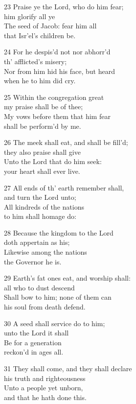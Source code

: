 23 Praise ye the Lord, who do him fear;\\
him glorify all ye\\
The seed of Jacob: fear him all\\
that Isr’el’s children be.

24 For he despis’d not nor abhorr’d\\
th’ afflicted’s misery;\\
Nor from him hid his face, but heard\\
when he to him did cry.

25 Within the congregation great\\
my praise shall be of thee;\\
My vows before them that him fear\\
shall be perform’d by me.

26 The meek shall eat, and shall be fill’d;\\
they also praise shall give\\
Unto the Lord that do him seek:\\
your heart shall ever live.

27 All ends of th’ earth remember shall,\\
and turn the Lord unto;\\
All kindreds of the nations\\
to him shall homage do:

28 Because the kingdom to the Lord\\
doth appertain as his;\\
Likewise among the nations\\
the Governor he is.

29 Earth’s fat ones eat, and worship shall:\\
all who to dust descend\\
Shall bow to him; none of them can\\
his soul from death defend.

30 A seed shall service do to him;\\
unto the Lord it shall\\
Be for a generation\\
reckon’d in ages all.

31 They shall come, and they shall declare\\
his truth and righteousness\\
Unto a people yet unborn,\\
and that he hath done this.

\begin{center}
\quad{}\quad{}
\end{center}

